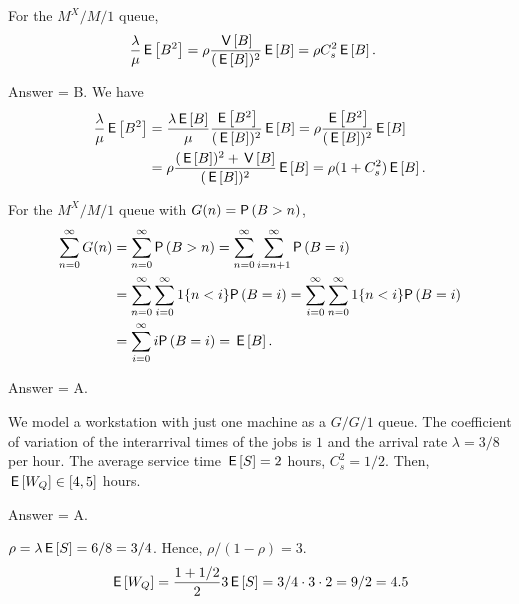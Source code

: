 \begin{exercise}[201704]%
For the $M^X/M/1$ queue, 
\begin{equation*}
  \begin{split}
  \frac{\lambda}\mu \,\mathsf{E}\left[B^2\right] 
&= \rho \frac{\,\mathsf{V}\left[B\right]}{(\,\mathsf{E}\left[B\right])^2}\,\mathsf{E}\left[B\right] = \rho C_s^2\,\mathsf{E}\left[B\right].
  \end{split}
\end{equation*}
\begin{solution} Answer = B.
We have
\begin{equation*}
  \begin{split}
  \frac{\lambda}\mu \,\mathsf{E}\left[B^2\right] 
&=   \frac{\lambda\,\mathsf{E}\left[B\right]}{\mu} \frac{\,\mathsf{E}\left[B^2\right]}{(\,\mathsf{E}\left[B\right])^2} \,\mathsf{E}\left[B\right]  = \rho \frac{\,\mathsf{E}\left[B^2\right]}{(\,\mathsf{E}\left[B\right])^2} \,\mathsf{E}\left[B\right] \\
&= \rho \frac{(\,\mathsf{E}\left[B\right])^2+\,\mathsf{V}\left[B\right]}{(\,\mathsf{E}\left[B\right])^2}\,\mathsf{E}\left[B\right] = \rho (1+C_s^2)\,\mathsf{E}\left[B\right].
  \end{split}
\end{equation*}
\end{solution}
\end{exercise}

\begin{exercise}[201704]%
  For the $M^X/M/1$ queue with $G(n) = \P{B> n}$, 
\begin{align*}
\sum_{n=0}^\infty G(n) 
&= \sum_{n=0}^\infty \P{B>n} 
= \sum_{n=0}^\infty \sum_{i=n+1}^\infty \P{B=i}  \\
& = \sum_{n=0}^\infty \sum_{i=0}^\infty 1\{n<i\} \P{B=i} 
= \sum_{i=0}^\infty \sum_{n=0}^\infty 1 \{n<i\} \P{B=i} \\
&= \sum_{i=0}^\infty i \P{B=i} = \E B.
\end{align*}
\begin{solution} Answer = A.
\end{solution}
\end{exercise}

\begin{exercise}[201704]%
  We model a workstation with just one machine as a $G/G/1$ queue. The coefficient of variation of the interarrival times of the jobs is $1$ and the arrival rate $\lambda=3/8$ per hour. The
  average service time $\,\mathsf{E}\left[S\right] = 2$ hours, $C^2_s = 1/2$.  Then, $\,\mathsf{E}\left[W_Q\right] \in [4, 5]$ hours. 
\begin{solution} Answer = A.

$\rho=\lambda \,\mathsf{E}\left[S\right] = 6/8 = 3/4$. Hence, $\rho/(1-\rho)=3$.
  \begin{equation*}
    \,\mathsf{E}\left[W_Q\right]= \frac{1+1/2}2 3 \,\mathsf{E}\left[S\right] = 3/4 \cdot 3 \cdot 2 = 9/2 = 4.5
  \end{equation*}
\end{solution}

\end{exercise}


